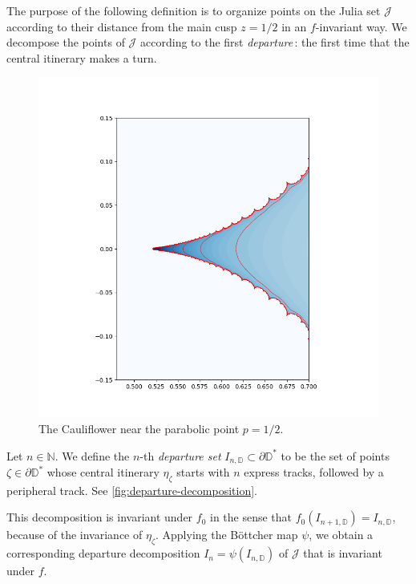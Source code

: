 The purpose of the following definition is to organize points on the Julia set $\mathcal J$ according to their distance from the main cusp $z=1/2$ in an $f$-invariant way. We decompose the points of $\mathcal J$ according to the first \emph{departure}\,: the first time that the central itinerary makes a turn.

\begin{figure}
    \centering
    \includegraphics[width=\textwidth]{figures/cauliflower_equipotentials2.png}
    \caption{The Cauliflower near the parabolic point $p=1/2$.}
    \label{fig:my_figure}
\end{figure}

\begin{definition}

Let $n \in \mathbb N$. We define the $n$-th \emph{departure set} $I_{n, \mathbb D} \subset \partial \mathbb D ^*$ to be the set of points $\zeta \in \partial \mathbb D^*$ whose central itinerary $\eta_{\zeta}$ starts with $n$ express tracks, followed by a peripheral track.
See \cref{fig:departure-decomposition}.
\end{definition}

This decomposition is invariant under $f_0$ in the sense that $f_0(I_{n+1, \mathbb D})=I_{n, \mathbb D}$, because of the invariance of $\eta _\zeta$.
Applying the Böttcher map $\psi$, we obtain a corresponding departure decomposition $I_n = \psi(I_{n, \mathbb D})$ of $\mathcal J$ that is invariant under $f$.

